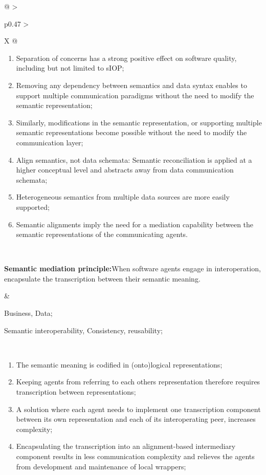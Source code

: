 \begin{xltabular}[l]{\linewidth}{@{} >{\small\raggedright\arraybackslash}p{0.47\linewidth} >{\small\raggedright\arraybackslash}X @{}}
\begin{enumerate}[left=10pt, nosep]
  \item Separation of concerns has a strong positive effect on software quality, including but not limited to sIOP;
  \item Removing any dependency between semantics and data syntax enables to support multiple communication paradigms without the need to modify the semantic representation;
  \item Similarly, modifications in the semantic representation, or supporting multiple semantic representations become possible without the need to modify the communication layer;
  \item Align semantics, not data schemata: Semantic reconciliation is applied at a higher conceptual level and abstracts away from data communication schemata;
  \item Heterogeneous semantics from multiple data sources are more easily supported;
  \item Semantic alignments imply the need for a mediation capability between the semantic representations of the communicating agents.
\end{enumerate} \\
%
%
%
\begin{mmdp}\label{dp:mediation}{\bfseries Semantic mediation principle:}\quad When software agents engage in interoperation, encapsulate the transcription between their semantic meaning.\end{mmdp}
&
\begin{description}[labelwidth=3.7cm,leftmargin=3.7cm+1ex,nosep,topsep=2ex,labelsep=1ex,font=\bfseries]
\item[Type of information:] Business, Data;
\item[Quality attributes:] Semantic interoperability, Consistency, reusability;
\end{description} \\
\begin{enumerate}[left=6pt, nosep]
  \item The semantic meaning is codified in (onto)logical representations;
  \item Keeping agents from referring to each others representation therefore requires transcription between representations;
  \item A solution where each agent needs to implement one transcription component between its own representation and each of its interoperating peer, increases complexity;
  \item Encapsulating the transcription into an alignment-based intermediary component results in less communication complexity and relieves the agents from development and maintenance of local wrappers;

\end{enumerate}
\end{xltabular}
